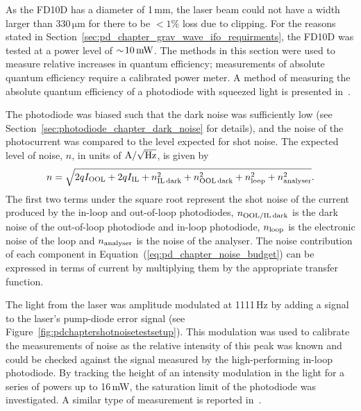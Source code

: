\par
As the FD10D has a diameter of 1\,mm, the laser beam could not have a width larger than $330\,\si{\micro\metre}$ for there to be $<1\%$ loss due to clipping. For the reasons stated in Section~\ref{sec:pd_chapter_grav_wave_ifo_requirments}, the FD10D was tested at a power level of $\sim\!10\,\rm{mW}$. The methods in this section were used to measure relative increases in quantum efficiency; measurements of absolute quantum efficiency require a calibrated power meter. A method of measuring the absolute quantum efficiency of a photodiode with squeezed light is presented in~\cite{Vahlbruch_2016}.
\par
The photodiode was biased such that the dark noise was sufficiently low (see Section~\ref{sec:photodiode_chapter_dark_noise} for details), and the noise of the photocurrent was compared to the level expected for shot noise. The expected level of noise, $n$, in units of $\rm{A/\sqrt{Hz}}$, is given by
\begin{equation}
n = \sqrt{2qI_{\rm{OOL}} + 2qI_{\rm{IL}} + n_{\rm{IL\,dark}}^2 +   n_{\rm{OOL\,dark}}^2 + n_{\rm{loop}}^2 + n^2_{\rm{analyser}}}.
\label{eq:pd_chapter_noise_budget}
\end{equation}
The first two terms under the square root represent the shot noise of the current produced by the in-loop and out-of-loop photodiodes, $n_{\rm{OOL/IL\,dark}}$ is the dark noise of the out-of-loop photodiode and in-loop photodiode, $n_{\rm{loop}}$ is the electronic noise of the loop and $n_{\rm{analyser}}$ is the noise of the analyser. The noise contribution of each component in Equation~(\ref{eq:pd_chapter_noise_budget}) can be expressed in terms of current by multiplying them by the appropriate transfer function.
\par
The light from the laser was amplitude modulated at 1111\,Hz by adding a signal to the laser's pump-diode error signal (see Figure~\ref{fig:pdchaptershotnoisetestsetup}). This modulation was used to calibrate the measurements of noise as the relative intensity of this peak was known and could be checked against the signal measured by the high-performing in-loop photodiode. By tracking the height of an intensity modulation in the light for a series of powers up to 16\,mW, the saturation limit of the photodiode was investigated. A similar type of measurement is reported in~\cite{L_pez_2010}.
